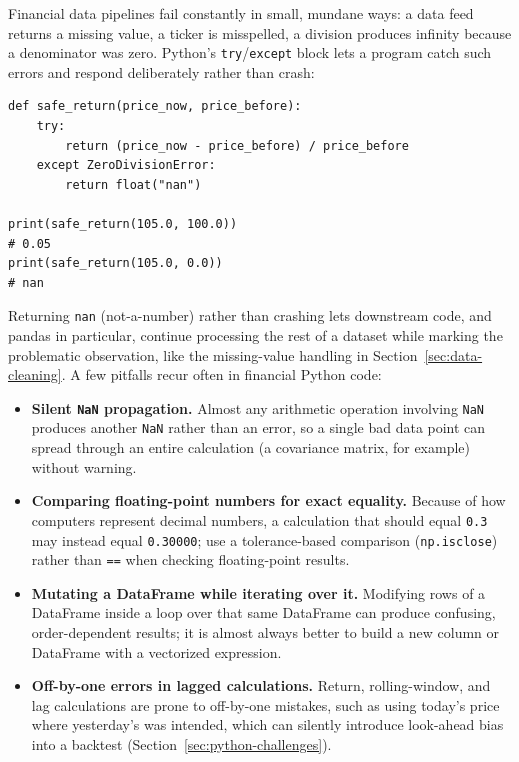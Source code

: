 \documentclass[../ai_in_finance]{subfiles}
\begin{document}
Financial data pipelines fail constantly in small, mundane ways: a data feed returns a missing value, a ticker is misspelled, a division produces infinity because a denominator was zero. Python's \texttt{try}/\texttt{except} block lets a program catch such errors and respond deliberately rather than crash:

\begin{verbatim}
def safe_return(price_now, price_before):
    try:
        return (price_now - price_before) / price_before
    except ZeroDivisionError:
        return float("nan")

print(safe_return(105.0, 100.0))
# 0.05
print(safe_return(105.0, 0.0))
# nan
\end{verbatim}

Returning \texttt{nan} (not-a-number) rather than crashing lets downstream code, and pandas in particular, continue processing the rest of a dataset while marking the problematic observation, like the missing-value handling in Section~\ref{sec:data-cleaning}. A few pitfalls recur often in financial Python code:

\begin{itemize}
    \item \textbf{Silent \texttt{NaN} propagation.} Almost any arithmetic operation involving \texttt{NaN} produces another \texttt{NaN} rather than an error, so a single bad data point can spread through an entire calculation (a covariance matrix, for example) without warning.
    \item \textbf{Comparing floating-point numbers for exact equality.} Because of how computers represent decimal numbers, a calculation that should equal \texttt{0.3} may instead equal \texttt{0.30000}; use a tolerance-based comparison (\texttt{np.isclose}) rather than \texttt{==} when checking floating-point results.
    \item \textbf{Mutating a DataFrame while iterating over it.} Modifying rows of a DataFrame inside a loop over that same DataFrame can produce confusing, order-dependent results; it is almost always better to build a new column or DataFrame with a vectorized expression.
    \item \textbf{Off-by-one errors in lagged calculations.} Return, rolling-window, and lag calculations are prone to off-by-one mistakes, such as using today's price where yesterday's was intended, which can silently introduce look-ahead bias into a backtest (Section~\ref{sec:python-challenges}).
\end{itemize}
\end{document}
